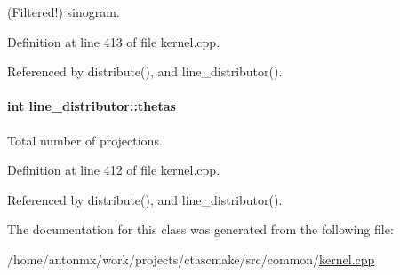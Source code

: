 (Filtered!) sinogram. 



Definition at line 413 of file kernel.cpp.



Referenced by distribute(), and line\_\-distributor().

\hypertarget{classline__distributor_ad2f703043945e7e06b5436e083fdd7b7}{
\paragraph[{thetas}]{\setlength{\rightskip}{0pt plus 5cm}int {\bf line\_\-distributor::thetas}}\hfill}
\label{classline__distributor_ad2f703043945e7e06b5436e083fdd7b7}


Total number of projections. 



Definition at line 412 of file kernel.cpp.



Referenced by distribute(), and line\_\-distributor().



The documentation for this class was generated from the following file:\begin{DoxyCompactItemize}
\item 
/home/antonmx/work/projects/ctascmake/src/common/\hyperlink{kernel_8cpp}{kernel.cpp}\end{DoxyCompactItemize}
